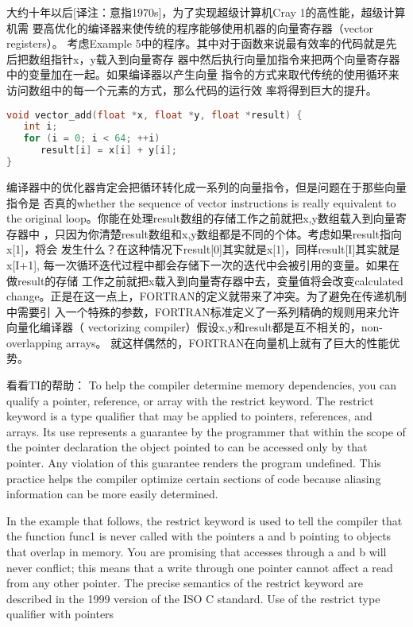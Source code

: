 \documentclass[a4paper,11pt]{book}
\begin{document}
大约十年以后[译注：意指1970s]，为了实现超级计算机Cray 1的高性能，超级计算机需
要高优化的编译器来使传统的程序能够使用机器的向量寄存器（vector registers）。
考虑Example 5中的程序。其中对于函数来说最有效率的代码就是先后把数组指针x，y载入到向量寄存
器中然后执行向量加指令来把两个向量寄存器中的变量加在一起。如果编译器以产生向量
指令的方式来取代传统的使用循环来访问数组中的每一个元素的方式，那么代码的运行效
率将得到巨大的提升。
\begin{lstlisting}[language=c, caption='Example 5:']
void vector_add(float *x, float *y, float *result) {
   int i;
   for (i = 0; i < 64; ++i)
      result[i] = x[i] + y[i];
}
\end{lstlisting}
编译器中的优化器肯定会把循环转化成一系列的向量指令，但是问题在于那些向量指令是
否真的whether the sequence of vector instructions is really equivalent to the
original loop。你能在处理result数组的存储工作之前就把x,y数组载入到向量寄存器中
，只因为你清楚result数组和x,y数组都是不同的个体。考虑如果result指向x[1]，将会
发生什么？在这种情况下result[0]其实就是x[1]，同样result[I]其实就是x[I+1],
每一次循环迭代过程中都会存储下一次的迭代中会被引用的变量。如果在做result的存储
工作之前就把x载入到向量寄存器中去，变量值将会改变calculated
change。正是在这一点上，FORTRAN的定义就带来了冲突。为了避免在传递机制中需要引
入一个特殊的参数，FORTRAN标准定义了一系列精确的规则用来允许向量化编译器（
vectorizing compiler）假设x,y和result都是互不相关的，non-overlapping arrays。
就这样偶然的，FORTRAN在向量机上就有了巨大的性能优势。


看看TI的帮助：   
To help the compiler determine memory dependencies, you can qualify a pointer,
reference, or array with the restrict keyword. The restrict keyword is a type
qualifier that may be applied to pointers, references, and arrays. Its use
represents a guarantee by the programmer that within the scope of the pointer
declaration the object pointed to can be accessed only by that pointer. Any
violation of this guarantee renders the program undefined. This practice helps
the compiler optimize certain sections of code because aliasing information
can be more easily determined. 

In the example that follows, the restrict keyword is used to tell the compiler
that the function func1 is never called with the pointers a and b pointing to
objects that overlap in memory. You are promising that accesses through a and
b will never conflict; this means that a write through one pointer cannot
affect a read from any other pointer. The precise semantics of the restrict
keyword are described in the 1999 version of the ISO C standard. 
Use of the restrict type qualifier with pointers 
\end{document}
